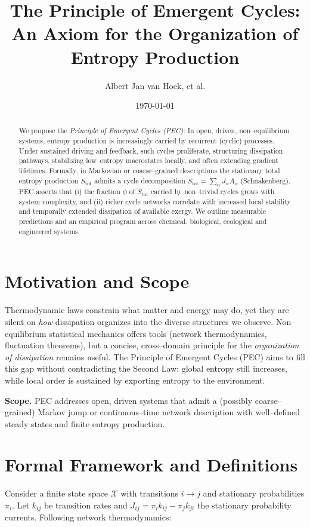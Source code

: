 \documentclass[12pt,a4paper]{article}
\title{The Principle of Emergent Cycles:\\
An Axiom for the Organization of Entropy Production}
\author{Albert Jan van Hoek, et al.}
\date{\today}
\begin{document}
\maketitle

\begin{abstract}
We propose the \emph{Principle of Emergent Cycles (PEC)}:
In open, driven, non--equilibrium systems, entropy production is increasingly carried by recurrent (cyclic) processes. Under sustained driving and feedback, such cycles proliferate, structuring dissipation pathways, stabilizing low--entropy macrostates locally, and often extending gradient lifetimes. Formally, in Markovian or coarse--grained descriptions the stationary total entropy production $\dot S_{\mathrm{tot}}$ admits a cycle decomposition $\dot S_{\mathrm{tot}} = \sum_{\alpha} J_\alpha A_\alpha$ (Schnakenberg). PEC asserts that (i) the fraction $\phi$ of $\dot S_{\mathrm{tot}}$ carried by non--trivial cycles grows with system complexity, and (ii) richer cycle networks correlate with increased local stability and temporally extended dissipation of available exergy. We outline measurable predictions and an empirical program across chemical, biological, ecological and engineered systems.
\end{abstract}

\section{Motivation and Scope}
Thermodynamic laws constrain what matter and energy may do, yet they are silent on \emph{how} dissipation organizes into the diverse structures we observe. Non--equilibrium statistical mechanics offers tools (network thermodynamics, fluctuation theorems), but a concise, cross--domain principle for the \emph{organization of dissipation} remains useful. The Principle of Emergent Cycles (PEC) aims to fill this gap without contradicting the Second Law: global entropy still increases, while local order is sustained by exporting entropy to the environment.

\textbf{Scope.} PEC addresses open, driven systems that admit a (possibly coarse--grained) Markov jump or continuous--time network description with well--defined steady states and finite entropy production.

\section{Formal Framework and Definitions}
Consider a finite state space $\mathcal{X}$ with transitions $i \to j$ and stationary probabilities $\pi_i$. Let $k_{ij}$ be transition rates and $J_{ij} = \pi_i k_{ij} - \pi_j k_{ji}$ the stationary probability currents. Following network thermodynamics:
\end{document}
